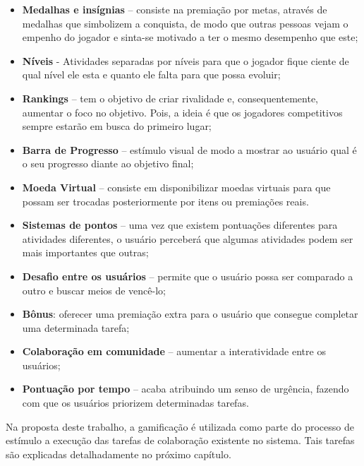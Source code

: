 \begin{itemize}
\item \textbf{Medalhas e insígnias} – consiste na premiação por metas, através de medalhas que simbolizem a conquista, de modo que outras pessoas vejam o empenho do jogador e sinta-se motivado a ter o mesmo desempenho que este;
\item \textbf{Níveis} -  Atividades separadas por níveis para que o jogador fique ciente de qual nível ele esta e quanto ele falta para que possa evoluir;
\item \textbf{Rankings} – tem o objetivo de criar rivalidade e, consequentemente, aumentar o foco no objetivo. Pois, a ideia é que os jogadores competitivos sempre estarão em busca do primeiro lugar;
\item \textbf{Barra de Progresso} – estímulo visual de modo a mostrar ao usuário qual é o seu progresso diante ao objetivo final;
\item \textbf{Moeda Virtual} – consiste em disponibilizar moedas virtuais para que possam ser trocadas posteriormente por itens ou premiações reais.
\item \textbf{Sistemas de pontos} – uma vez que existem pontuações diferentes para atividades diferentes, o usuário perceberá que algumas atividades podem ser mais importantes que outras;
\item \textbf{Desafio entre os usuários} – permite que o usuário possa ser comparado a outro e buscar meios de vencê-lo;
\item \textbf{Bônus}: oferecer uma premiação extra para o usuário que consegue completar uma determinada tarefa;
\item \textbf{Colaboração em comunidade} – aumentar a interatividade entre os usuários;
\item \textbf{Pontuação por tempo} – acaba atribuindo um senso de urgência, fazendo com que os usuários priorizem determinadas tarefas.
\end{itemize}

Na proposta deste trabalho, a gamificação é utilizada como parte do processo de estímulo  a execução das tarefas de colaboração existente no sistema. Tais tarefas são explicadas detalhadamente no próximo capítulo.

